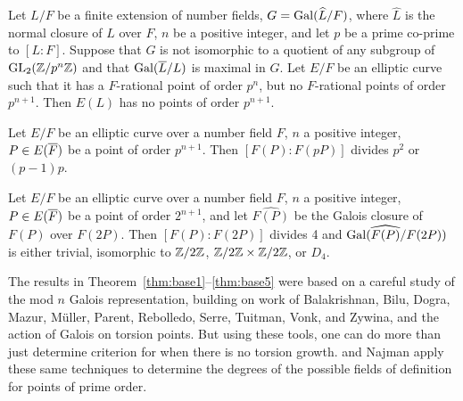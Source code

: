 \begin{thm} \label{thm:base3}
Let $L/F$ be a finite extension of number fields, $G= \operatorname{Gal}(\widehat{L}/F)$, where $\widehat{L}$ is the normal closure of $L$ over $F$, $n$ be a positive integer, and let $p$ be a prime co-prime to $[L \colon F]$. Suppose that $G$ is not isomorphic to a quotient of any subgroup of $\operatorname{GL}_2(\mathbb{Z}/p^n\mathbb{Z})$ and that $\operatorname{Gal}(\overline{L}/L)$ is maximal in $G$. Let $E/F$ be an elliptic curve such that it has a $F$-rational point of order $p^n$, but no $F$-rational points of order $p^{n+1}$. Then $E(L)$ has no points of order $p^{n+1}$. 
\end{thm}


\begin{thm} \label{thm:base4}
Let $E/F$ be an elliptic curve over a number field $F$, $n$ a positive integer, $P \in E(\overline{F})$ be a point of order $p^{n+1}$. Then $[F(P) \colon F(pP)]$ divides $p^2$ or $(p-1)p$. 
\end{thm}


\begin{thm} \label{thm:base5}
Let $E/F$ be an elliptic curve over a number field $F$, $n$ a positive integer, $P \in E(\overline{F})$ be a point of order $2^{n+1}$, and let $\widehat{F(P)}$ be the Galois closure of $F(P)$ over $F(2P)$. Then $[F(P) \colon F(2P)]$ divides 4 and $\operatorname{Gal}(\widehat{F(P)}/F(2P))$ is either trivial, isomorphic to $\mathbb{Z}/2\mathbb{Z}$, $\mathbb{Z}/2\mathbb{Z} \times \mathbb{Z}/2\mathbb{Z}$, or $D_4$. 
\end{thm}


The results in Theorem~\ref{thm:base1}--\ref{thm:base5} were based on a careful study of the mod $n$ Galois representation, building on work of Balakrishnan, Bilu, Dogra, Mazur, M\"uller, Parent, Rebolledo, Serre, Tuitman, Vonk, and Zywina, and the action of Galois on torsion points. But using these tools, one can do more than just determine criterion for when there is no torsion growth. \gonjim{} and Najman apply these same techniques to determine the degrees of the possible fields of definition for points of prime order. 


